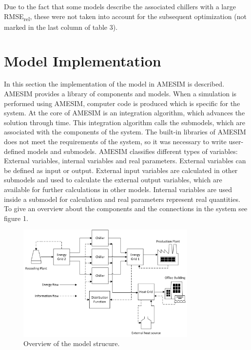 \documentclass[3p,times,procedia,twocolumn,twoside]{elsarticle}
\begin{document}
Due to the fact that some models describe the associated chillers with a large RMSE\textsubscript{rel}, these were not taken into account for the subsequent optimization (not marked in the last column of table 3).

\section{Model Implementation}

In this section the implementation of the model in AMESIM is described. AMESIM provides a library of components and models. When a simulation is performed using AMESIM, computer code is produced which is specific for the system. At the core of AMESIM is an integration algorithm, which advances the solution through time. This integration algorithm calls the submodels, which are associated with the components of the system. The built-in libraries of AMESIM does not meet the requirements of the system, so it was necessary to write user-defined models and submodels. AMESIM classifies different types of variables: External variables, internal variables and real parameters. External variables can be defined as input or output. External input variables are calculated in other submodels and used to calculate the external output variables, which are available for further calculations in other models. Internal variables are used inside a submodel for calculation and real parameters represent real quantities.
To give an overview about the components and the connections in the system see figure 1.

\begin{figure}[t]
	\vspace*{10pt}
	\centerline{\includegraphics[width=21pc]{figures/modelstructure}}
	\caption{Overview of the model strucure.}
\end{figure}
\end{document}
